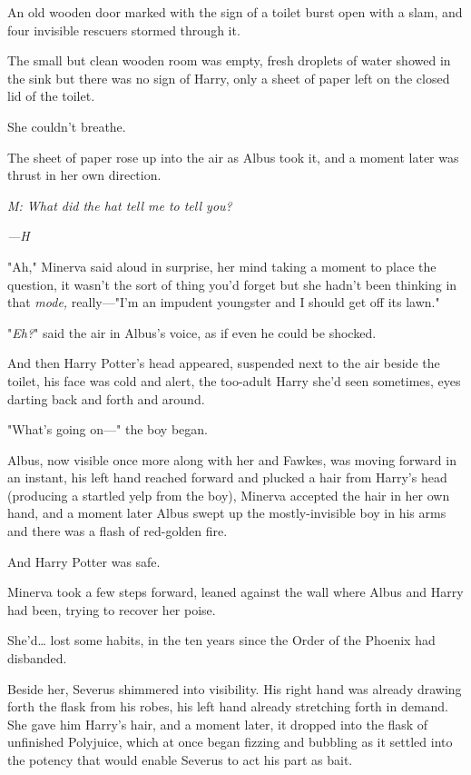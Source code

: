 An old wooden door marked with the sign of a toilet burst open with a slam, and
four invisible rescuers stormed through it.

The small but clean wooden room was empty, fresh droplets of water showed in
the sink but there was no sign of Harry, only a sheet of paper left on the
closed lid of the toilet.

She couldn't breathe.

The sheet of paper rose up into the air as Albus took it, and a moment later
was thrust in her own direction.

\emph{M: What did the hat tell me to tell you?}

\emph{---H}

"Ah," Minerva said aloud in surprise, her mind taking a moment to place the
question, it wasn't the sort of thing you'd forget but she hadn't been thinking
in that \emph{mode,} really---"I'm an impudent youngster and I should get off
its lawn."

"\emph{Eh?}" said the air in Albus's voice, as if even he could be shocked.

And then Harry Potter's head appeared, suspended next to the air beside the
toilet, his face was cold and alert, the too-adult Harry she'd seen sometimes,
eyes darting back and forth and around.

"What's going on---" the boy began.

Albus, now visible once more along with her and Fawkes, was moving forward in
an instant, his left hand reached forward and plucked a hair from Harry's head
(producing a startled yelp from the boy), Minerva accepted the hair in her own
hand, and a moment later Albus swept up the mostly-invisible boy in his arms
and there was a flash of red-golden fire.

And Harry Potter was safe.

Minerva took a few steps forward, leaned against the wall where Albus and Harry
had been, trying to recover her poise.

She'd{\ldots} lost some habits, in the ten years since the Order of the Phoenix
had disbanded.

Beside her, Severus shimmered into visibility. His right hand was already
drawing forth the flask from his robes, his left hand already stretching forth
in demand. She gave him Harry's hair, and a moment later, it dropped into the
flask of unfinished Polyjuice, which at once began fizzing and bubbling as it
settled into the potency that would enable Severus to act his part as bait.

